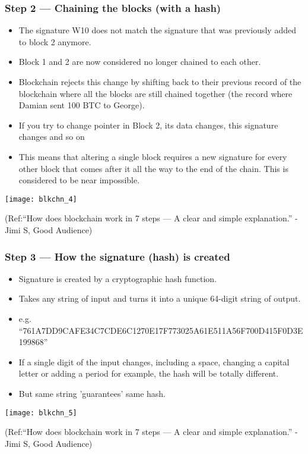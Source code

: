 \begin{frame}[fragile]\frametitle{Step 2 — Chaining the blocks (with a hash)}
\begin{itemize}
\item The signature W10 does not match the signature that was previously added to block 2 anymore. 
\item Block 1 and 2 are now considered no longer chained to each other. 
\item Blockchain rejects this change by shifting back to their previous record of the blockchain where all the blocks are still chained together (the record where Damian sent 100 BTC to George).
\item If you try to change pointer in Block 2, its data changes, this signature changes and so on
\item This means that altering a single block requires a new signature for every other block that comes after it all the way to the end of the chain. This is considered to be near impossible.
\end{itemize}

\begin{center}
\texttt{[image: blkchn\_4]}

{\tiny (Ref:``How does blockchain work in 7 steps — A clear and simple explanation.'' - Jimi S, Good Audience)}
\end{center}

\end{frame}

\begin{frame}[fragile]\frametitle{Step 3 — How the signature (hash) is created}
\begin{itemize}
\item Signature is created by a cryptographic hash function. 
\item Takes any string of input and turns it into a unique 64-digit string of output.
\item e.g. ``761A7DD9CAFE34C7CDE6C1270E17F773025A61E511A56F700D415F0D3E199868''
\item If a single digit of the input changes, including a space, changing a capital letter or adding a period for example, the hash will be totally different.
\item But same string 'guarantees' same hash.
\end{itemize}

\begin{center}
\texttt{[image: blkchn\_5]}

{\tiny (Ref:``How does blockchain work in 7 steps — A clear and simple explanation.'' - Jimi S, Good Audience)}
\end{center}

\end{frame}

